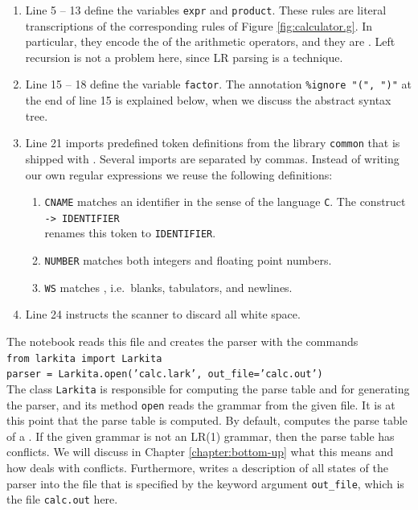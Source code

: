 \begin{enumerate}
      As \texttt{stmnt} is the first syntactical variable of the grammar, it is the .
\item Line 5 -- 13 define the variables \texttt{expr} and \texttt{product}.  These rules are literal
      transcriptions of the corresponding rules of Figure \ref{fig:calculator.g}.  In particular, they
      encode the  of the arithmetic operators, and they are .
      Left recursion is not a problem here, since LR parsing is a  technique.
\item Line 15 -- 18 define the variable \texttt{factor}.  The annotation \texttt{\%ignore "(", ")"} at the end
      of line 15 is explained below, when we discuss the abstract syntax tree.
\item Line 21 imports predefined token definitions from the library \texttt{common} that is shipped
      with .  Several imports are separated by commas.  Instead of writing our own regular
      expressions we reuse the following definitions:
      \begin{enumerate}
      \item \texttt{CNAME} matches an identifier in the sense of the language \texttt{C}.  The construct
            \\[0.2cm]
            \hspace*{1.3cm}
            \texttt{-> IDENTIFIER}
            \\[0.2cm]
            renames this token to \texttt{IDENTIFIER}.
      \item \texttt{NUMBER} matches both integers and floating point numbers.
      \item \texttt{WS} matches , i.e.~blanks, tabulators, and newlines.
      \end{enumerate}
\item Line 24 instructs the scanner to discard all white space.
\end{enumerate}
The notebook reads this file and creates the parser with the commands
\\[0.2cm]
\hspace*{1.3cm}
\texttt{from larkita import Larkita}
\\[0.1cm]
\hspace*{1.3cm}
\texttt{parser = Larkita.open('calc.lark', out\_file='calc.out')}
\\[0.2cm]
The class \texttt{Larkita} is responsible for computing the parse table and for generating the parser, and its
method \texttt{open} reads the grammar from the given file.  It is at this point that the parse table is
computed.  By default,  computes the parse table of a .  If the
given grammar is not an LR(1) grammar, then the parse table has conflicts.  We will discuss in Chapter
\ref{chapter:bottom-up} what this means and how  deals with conflicts.  Furthermore,
 writes a description of all states of the parser into the file that is specified by the
keyword argument \texttt{out\_file}, which is the file \texttt{calc.out} here.
\FloatBarrier

